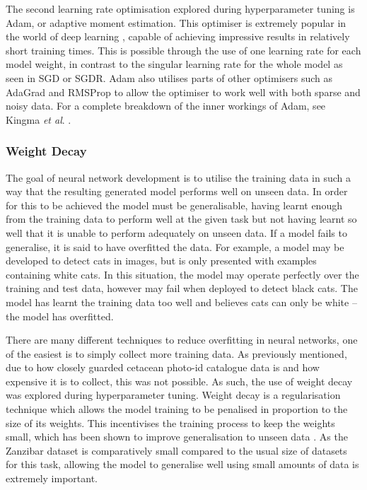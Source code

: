 The second learning rate optimisation explored during hyperparameter tuning is Adam, or adaptive moment estimation. This optimiser is extremely popular in the world of deep learning \cite{karpathy_peek_2017}, capable of achieving impressive results in relatively short training times. This is possible through the use of one learning rate for each model weight, in contrast to the singular learning rate for the whole model as seen in SGD or SGDR. Adam also utilises parts of other optimisers such as AdaGrad \cite{duchi_adaptive_2011} and RMSProp \cite{tieleman_lecture_2012} to allow the optimiser to work well with both sparse and noisy data. For a complete breakdown of the inner workings of Adam, see Kingma \textit{et al}. \cite{kingma_adam:_2014}. 

\subsubsection{Weight Decay}\label{ch:cetDet,sec:ModelSelection,sub:TrainingHyperparameters,subsub:WeightDecay}

The goal of neural network development is to utilise the training data in such a way that the resulting generated model performs well on unseen data. In order for this to be achieved the model must be generalisable, having learnt enough from the training data to perform well at the given task but not having learnt so well that it is unable to perform adequately on unseen data. If a model fails to generalise, it is said to have overfitted the data. For example, a model may be developed to detect cats in images, but is only presented with examples containing white cats. In this situation, the model may operate perfectly over the training and test data, however may fail when deployed to detect black cats. The model has learnt the training data too well and believes cats can only be white -- the model has overfitted. 

There are many different techniques to reduce overfitting in neural networks, one of the easiest is to simply collect more training data. As previously mentioned, due to how closely guarded cetacean photo-id catalogue data is and how expensive it is to collect, this was not possible. As such, the use of weight decay was explored during hyperparameter tuning. Weight decay is a regularisation technique which allows the model training to be penalised in proportion to the size of its weights. This incentivises the training process to keep the weights small, which has been shown to improve generalisation to unseen data \cite{krogh_simple_1991}. As the Zanzibar dataset is comparatively small compared to the usual size of datasets for this task, allowing the model to generalise well using small amounts of data is extremely important.

